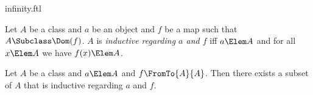 \documentclass{stex}
\begin{document}
\begin{smodule}{infinity.ftl}



\begin{definition*}[forthel,for=inductive]
  Let $A$ be a class and $a$ be an object and $f$ be a map such that $A \Subclass \Dom(f)$.
  $A$ is \emph{inductive regarding $a$ and $f$} iff $a \Elem A$ and for all $x \Elem A$ we have $f(x) \Elem A$.
\end{definition*}

\begin{axiom*}[forthel,title=Axiom,name=Axiom of Infinity]
  Let $A$ be a class and $a \Elem A$ and $f \FromTo{A}{A}$.
  Then there exists a subset of $A$ that is inductive regarding $a$ and $f$.
\end{axiom*}

\end{smodule}
\end{document}
